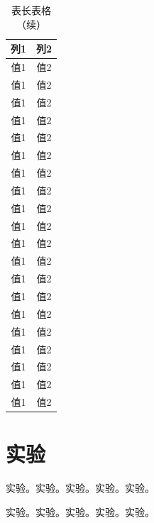 
    \begin{table}[!t]
        \centering
        \caption*{表\thetable \quad 长表格（续）}
        \begin{tabular}{c c}
            \toprule[1.5bp]
            列1 & 列2 \\
            \midrule[0.75bp]
            值1 & 值2 \\
            值1 & 值2 \\
            值1 & 值2 \\
            值1 & 值2 \\
            值1 & 值2 \\
            值1 & 值2 \\
            值1 & 值2 \\
            值1 & 值2 \\
            值1 & 值2 \\
            值1 & 值2 \\
            值1 & 值2 \\
            值1 & 值2 \\
            值1 & 值2 \\
            值1 & 值2 \\
            值1 & 值2 \\
            值1 & 值2 \\
            值1 & 值2 \\
            值1 & 值2 \\
            值1 & 值2 \\
            值1 & 值2 \\
            \bottomrule[1.5bp]
        \end{tabular}
    \end{table}

    \clearpage %

    \section{实验}
    实验。实验。实验。实验。实验。

    实验。实验。实验。实验。实验。
    